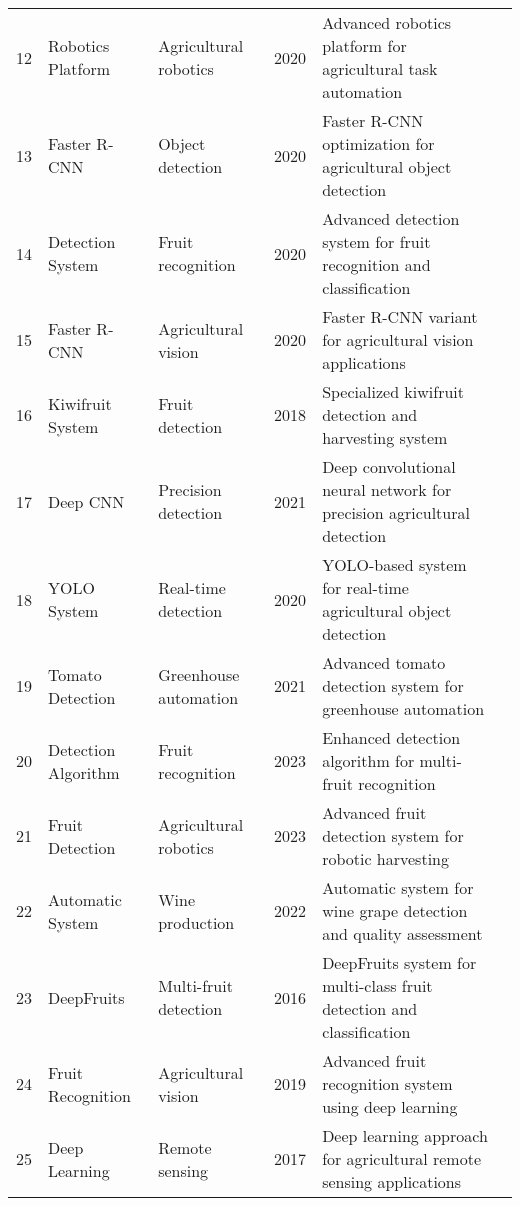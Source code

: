 \begin{table*}[htbp]
\begin{tabular}{p{}p{}p{}p{}p{}p{}}
 12 & Robotics Platform & Agricultural robotics & 2020 & Advanced robotics platform for agricultural task automation & \cite{mahmud2020robotics} \\
 13 & Faster R-CNN & Object detection & 2020 & Faster R-CNN optimization for agricultural object detection & \cite{wan2020faster} \\
 14 & Detection System & Fruit recognition & 2020 & Advanced detection system for fruit recognition and classification & \cite{jia2020detection} \\
 15 & Faster R-CNN & Agricultural vision & 2020 & Faster R-CNN variant for agricultural vision applications & \cite{fu2020faster} \\
 16 & Kiwifruit System & Fruit detection & 2018 & Specialized kiwifruit detection and harvesting system & \cite{fu2018kiwifruit} \\
 17 & Deep CNN & Precision detection & 2021 & Deep convolutional neural network for precision agricultural detection & \cite{chu2021deep} \\
 18 & YOLO System & Real-time detection & 2020 & YOLO-based system for real-time agricultural object detection & \cite{liu2020yolo} \\
 19 & Tomato Detection & Greenhouse automation & 2021 & Advanced tomato detection system for greenhouse automation & \cite{lawal2021tomato} \\
 20 & Detection Algorithm & Fruit recognition & 2023 & Enhanced detection algorithm for multi-fruit recognition & \cite{gai2023detection} \\
 21 & Fruit Detection & Agricultural robotics & 2023 & Advanced fruit detection system for robotic harvesting & \cite{tang2023fruit} \\
 22 & Automatic System & Wine production & 2022 & Automatic system for wine grape detection and quality assessment & \cite{sozzi2022automatic} \\
 23 & DeepFruits & Multi-fruit detection & 2016 & DeepFruits system for multi-class fruit detection and classification & \cite{sa2016deepfruits} \\
 24 & Fruit Recognition & Agricultural vision & 2019 & Advanced fruit recognition system using deep learning & \cite{yu2019fruit} \\
 25 & Deep Learning & Remote sensing & 2017 & Deep learning approach for agricultural remote sensing applications & \cite{rahnemoonfar2017deep} \\
\bottomrule
\end{tabular}
\end{table*}

